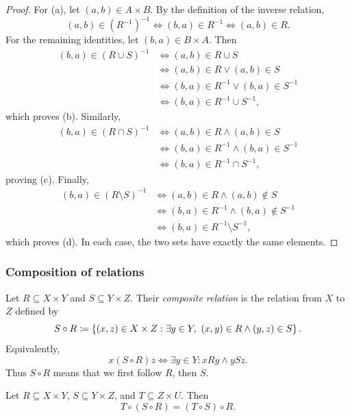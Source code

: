 \documentclass[11pt,a4paper]{amsart}
\begin{document}
\begin{proof}
  For (a), let \((a,b) \in A \times B\). By the definition of the inverse
  relation,
  \[
    (a,b) \in (R^{-1})^{-1}
    \iff (b,a) \in R^{-1}
    \iff (a,b) \in R.
  \]
  For the remaining identities, let \((b,a) \in B \times A\). Then
  \begin{align*}
    (b,a) \in (R \cup S)^{-1}
    &\iff (a,b) \in R \cup S \\
    &\iff (a,b) \in R \lor (a,b) \in S \\
    &\iff (b,a) \in R^{-1} \lor (b,a) \in S^{-1} \\
    &\iff (b,a) \in R^{-1} \cup S^{-1},
  \end{align*}
  which proves (b). Similarly,
  \begin{align*}
    (b,a) \in (R \cap S)^{-1}
    &\iff (a,b) \in R \land (a,b) \in S \\
    &\iff (b,a) \in R^{-1} \land (b,a) \in S^{-1} \\
    &\iff (b,a) \in R^{-1} \cap S^{-1},
  \end{align*}
  proving (c). Finally,
  \begin{align*}
    (b,a) \in (R \setminus S)^{-1}
    &\iff (a,b) \in R \land (a,b) \notin S \\
    &\iff (b,a) \in R^{-1} \land (b,a) \notin S^{-1} \\
    &\iff (b,a) \in R^{-1} \setminus S^{-1},
  \end{align*}
  which proves (d). In each case, the two sets have exactly the same elements.
\end{proof}

\subsubsection{Composition of relations}

\begin{definition}
  Let \(R \subseteq X \times Y\) and \(S \subseteq Y \times Z\).
  Their \emph{composite relation} is the relation from \(X\) to \(Z\)
  defined by
  \[
    S \circ R \coloneqq
    \left\lbrace(x,z) \in X \times Z :
    \exists y \in Y,\ (x,y) \in R \land (y,z) \in S\right\rbrace.
  \]
  Equivalently,
  \[
    x(S \circ R)z
    \iff \exists y \in Y : xRy \land ySz.
  \]
  Thus \(S \circ R\) means that we first follow \(R\), then \(S\).
\end{definition}

\begin{theorem}
  Let \(R \subseteq X \times Y\), \(S \subseteq Y \times Z\), and
  \(T \subseteq Z \times U\). Then
  \[
    T \circ (S \circ R) = (T \circ S) \circ R.
  \]
\end{theorem}
\end{document}
